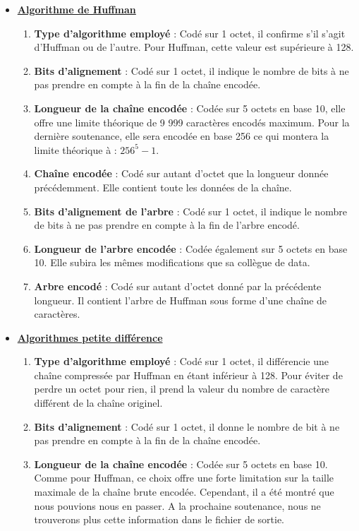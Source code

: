         \begin{itemize}
            \item \textbf{\underline{Algorithme de Huffman}}
                \begin{enumerate}
                    \item \textbf{Type d'algorithme employé} : Codé sur 1 octet, il confirme s'il s'agit d'Huffman ou de l'autre. Pour Huffman, cette valeur est supérieure à 128.
                    \item \textbf{Bits d'alignement} : Codé sur 1 octet, il indique le nombre de bits à ne pas prendre en compte à la fin de la chaîne encodée.
                    \item \textbf{Longueur de la chaîne encodée} : Codée sur 5 octets en base 10, elle offre une limite théorique de 9 999 caractères encodés maximum. Pour la dernière soutenance, elle sera encodée en base 256 ce qui montera la limite théorique à : $256^{5} - 1$.
                    \item \textbf{Chaîne encodée} : Codé sur autant d'octet que la longueur donnée précédemment. Elle contient toute les données de la chaîne.
                    \item \textbf{Bits d'alignement de l'arbre} : Codé sur 1 octet, il indique le nombre de bits à ne pas prendre en compte à la fin de l'arbre encodé.
                    \item \textbf{Longueur de l'arbre encodée} : Codée également sur 5 octets en base 10. Elle subira les mêmes modifications que sa collègue de data.
                    \item \textbf{Arbre encodé} : Codé sur autant d'octet donné par la précédente longueur. Il contient l'arbre de Huffman sous forme d'une chaîne de caractères.
                \end{enumerate}
            \item \textbf{\underline{Algorithmes petite différence}}
                \begin{enumerate}
                    \item \textbf{Type d'algorithme employé} : Codé sur 1 octet, il différencie une chaîne compressée par Huffman en étant inférieur à 128. Pour éviter de perdre un octet pour rien, il prend la valeur du nombre de caractère différent de la chaîne originel.
                    \item \textbf{Bits d'alignement} : Codé sur 1 octet, il donne le nombre de bit à ne pas prendre en compte à la fin de la chaîne encodée.
                    \item \textbf{Longueur de la chaîne encodée} : Codée sur 5 octets en base 10. Comme pour Huffman, ce choix offre une forte limitation sur la taille maximale de la chaîne brute encodée. Cependant, il a été montré que nous pouvions nous en passer. A la prochaine soutenance, nous ne trouverons plus cette information dans le fichier de sortie.

\end{enumerate}
\end{itemize}
